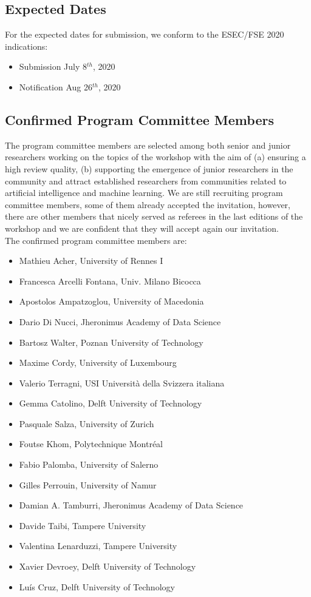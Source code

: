\subsection{Expected Dates}
For the expected dates for submission, we conform to the ESEC/FSE 2020 indications:
\begin{itemize}[itemsep=0.5em]
	\item Submission July 8$^{th}$, 2020
	\item Notification Aug 26$^{th}$, 2020
\end{itemize}


\subsection{Confirmed Program Committee Members}
The program committee members are selected among both senior and junior researchers working on the topics of the workshop with the aim of (a) ensuring a high review quality, (b) supporting the emergence of junior researchers in the community and attract established researchers from communities related to artificial intelligence and machine learning.
We are still recruiting program committee members, some of them already accepted the invitation, however, there are other members that nicely served as referees in the last editions of the workshop and we are confident that they will accept again our invitation.\\
The confirmed program committee members are:
\begin{itemize}[itemsep=0.5em]
	
	\item Mathieu Acher, University of Rennes I
	\item Francesca Arcelli Fontana, Univ. Milano Bicocca
	\item Apostolos Ampatzoglou, University of Macedonia
	\item Dario Di Nucci, Jheronimus Academy of Data Science
	\item Bartosz Walter, Poznan University of Technology
	\item Maxime Cordy, University of Luxembourg
	\item Valerio Terragni, USI Università della Svizzera italiana
	\item Gemma Catolino, Delft University of Technology
	\item Pasquale Salza, University of Zurich
	\item Foutse Khom, Polytechnique Montréal
	\item Fabio Palomba, University of Salerno
	\item Gilles Perrouin, University of Namur
	\item Damian A. Tamburri, Jheronimus Academy of Data Science
	\item Davide Taibi, Tampere University
	\item Valentina Lenarduzzi, Tampere University
	\item Xavier Devroey, Delft University of Technology
	\item Luís Cruz, Delft University of Technology
    
	
\end{itemize}
	

